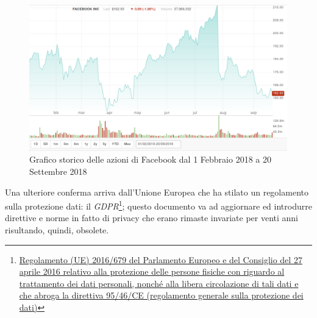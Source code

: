 \begin{figure}
    \centering
    \includegraphics[scale=1.2]{images/facebookstock.png}
    \caption{Grafico storico delle azioni di Facebook dal 1 Febbraio 2018 a 20 Settembre 2018}
\end{figure}
Una ulteriore conferma arriva dall'Unione Europea che ha stilato un regolamento sulla protezione dati: il \textit{GDPR}\footnote{\href{https://eur-lex.europa.eu/legal-content/IT/TXT/HTML/?uri=CELEX:32016R0679}{Regolamento (UE) 2016/679 del Parlamento Europeo e del Consiglio del 27 aprile 2016 relativo alla protezione delle persone fisiche con riguardo al trattamento dei dati personali, nonché alla libera circolazione di tali dati e che abroga la direttiva 95/46/CE (regolamento generale sulla protezione dei dati)}}; questo documento va ad aggiornare ed introdurre direttive e norme in fatto di privacy che erano rimaste invariate per venti anni risultando, quindi, obsolete.\newline

